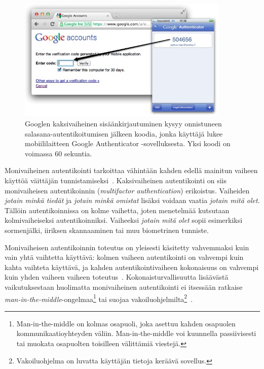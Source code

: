 \documentclass[finnish,gradu]{tktltiki}
\begin{document}
  \begin{figure}
    \centering
    \includegraphics[width=0.9\textwidth]{images/google_authenticator.jpg}
    \caption[Googlen kaksivaiheinen sisäänkirjautuminen.]{Googlen kaksivaiheinen sisäänkirjautuminen kysyy onnistuneen salasana-autentikoitumisen jälkeen koodia, jonka käyttäjä lukee mobiililaitteen Google Authenticator -sovelluksesta. Yksi koodi on voimassa 60 sekuntia.}
    \label{fig:google_authenticator}
  \end{figure}

  Monivaiheinen autentikointi tarkoittaa vähintään kahden edellä mainitun vaiheen käyttöä väittäjän tunnistamiseksi~\cite{NIST_SP800-63-1}. Kaksivaiheinen autentikointi on siis monivaiheisen autentikoinnin (\emph{multifactor authentication}) erikoistus. Vaiheiden \emph{jotain minkä tiedät} ja \emph{jotain minkä omistat} lisäksi voidaan vaatia \emph{jotain mitä olet}. Tällöin autentikoinnissa on kolme vaihetta, joten menetelmää kutsutaan kolmivaiheiseksi autentikoinniksi. Vaiheeksi \emph{jotain mitä olet} sopii esimerkiksi sormenjälki, iiriksen skannaaminen tai muu biometrinen tunniste.

  Monivaiheisen autentikoinnin toteutus on yleisesti käsitetty vahvemmaksi kuin vain yhtä vaihtetta käyttävä: kolmen vaiheen autentikointi on vahvempi kuin kahta vaihteta käyttävä, ja kahden autentikointivaiheen kokonaisuus on vahvempi kuin yhden vaiheen vaiheen toteutus~\cite{NIST_SP800-63-1}. Kokonaisturvallisuutta lisäävästä vaikutuksestaan huolimatta monivaiheinen autentikointi ei itsessään ratkaise \emph{man-in-the-middle}-ongelmaa\footnote{
  Man-in-the-middle on kolmas osapuoli, joka asettuu kahden osapuolen kommunikaatioyhteyden väliin. Man-in-the-middle voi kuunnella passiivisesti tai muokata osapuolten toisilleen välittämiä viestejä.}
tai suojaa vakoiluohjelmilta\footnote{Vakoiluohjelma on luvatta käyttäjän tietoja keräävä sovellus.}~\cite{schneier_2factor_2005}.
\end{document}
